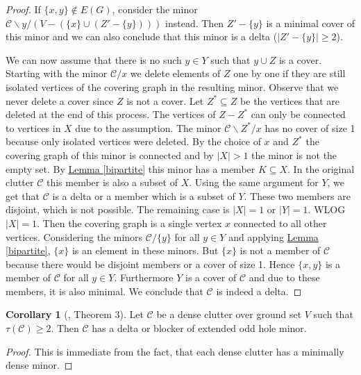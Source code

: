 \documentclass[a4paper, 12pt, twoside=false]{scrbook}
\theoremstyle{definition}
\newtheorem{corollary}[theorem]{Corollary}
\begin{document}
\begin{proof}
       If $\{x,y\} \not\in E(G)$, consider the minor $\mathcal{C} \backslash y / (V - (\{x\} \cup (Z'-\{y\})))$ instead.
       Then $Z' - \{y\}$ is a minimal cover of this minor and we can also conclude that this minor is a delta ($|Z'-\{y\}| \geq 2$).

       We can now assume that there is no such $y \in Y$ such that $y \cup Z$ is a cover.
       Starting with the minor $\mathcal{C} / x$ we delete elements of $Z$ one by one if they are still isolated vertices of the covering graph in the resulting minor.
       Observe that we never delete a cover since $Z$ is not a cover.
       Let $Z^* \subseteq Z$ be the vertices that are deleted at the end of this process.
       The vertices of $Z - Z^*$ can only be connected to vertices in $X$ due to the assumption.
       The minor $\mathcal{C} \backslash Z^* / x$ has no cover of size 1 because only isolated vertices were deleted.
       By the choice of $x$ and $Z^*$ the covering graph of this minor is connected and by $|X|>1$ the minor is not the empty set.
       By \hyperref[bipartite]{Lemma \ref*{bipartite}} this minor has a member $K \subseteq X$.
       In the original clutter $\mathcal{C}$ this member is also a subset of $X$.
       Using the same argument for $Y$, we get that $\mathcal{C}$ is a delta or a member which is a subset of $Y$.
       These two members are disjoint, which is not possible.
       The remaining case is $|X|=1$ or $|Y|=1$. WLOG $|X|=1$.
       Then the covering graph is a single vertex $x$ connected to all other vertices.
       Considering the minors $\mathcal{C} / \{y\}$ for all $y \in Y$ and applying \hyperref[bipartite]{Lemma \ref*{bipartite}}, $\{x\}$ is an element in these minors.
       But $\{x\}$ is not a member of $\mathcal{C}$ because there would be disjoint members or a cover of size 1.
       Hence $\{x,y\}$ is a member of $\mathcal{C}$ for all $y \in Y$.
       Furthermore $Y$ is a cover of $\mathcal{C}$ and due to these members, it is also minimal.
       We conclude that $\mathcal{C}$ is indeed a delta.
   \end{proof}
   \begin{corollary}[\cite{deltas}, Theorem 3]
       Let $\mathcal{C}$ be a dense clutter over ground set $V$ such that $\tau(\mathcal{C}) \geq 2$.
       Then $\mathcal{C}$ has a delta or blocker of extended odd hole minor.
   \end{corollary}

   \begin{proof}
       This is immediate from the fact, that each dense clutter has a minimally dense minor.
   \end{proof}
\end{document}

